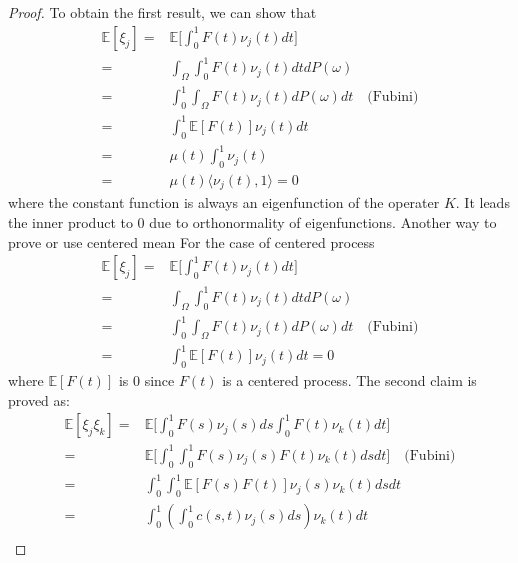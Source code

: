 \documentclass[11pt,twoside,a4paper]{article}
\begin{document}
	\begin{proof}
		To obtain the first result, we can show that
		\begin{equation}
			\begin{split}
				\mathbb{E}[\xi_{j}] = & \mathbb{E} \biggl\lbrack \int_{0}^{1} F(t) \nu_{j}(t)dt \biggr\rbrack\\
				= & \int_{\Omega} \int_{0}^{1} F(t) \nu_{j}(t) dt dP(\omega)\\
				= & \int_{0}^{1} \int_{\Omega} F(t) \nu_{j}(t) dP(\omega) dt \quad \text{(Fubini)}\\
				= & \int_{0}^{1} \mathbb{E}[F(t)] \nu_{j}(t) dt\\
				= & \mu(t) \int_{0}^{1} \nu_{j}(t)\\
				= & \mu(t) \langle \nu_{j}(t), 1 \rangle = 0
			\end{split}
		\end{equation}
		where the constant function is always an eigenfunction of the operater $K$. It leads the inner product to 0 due to orthonormality of eigenfunctions. {\color{red} Another way to prove or use centered mean}
		For the case of centered process
		\begin{equation}\label{Lemma1}
			\begin{split}
				\mathbb{E}[\xi_{j}] = & \mathbb{E} \biggl\lbrack \int_{0}^{1} F(t) \nu_{j}(t)dt\biggr\rbrack\\
				= & \int_{\Omega} \int_{0}^{1} F(t) \nu_{j}(t) dt dP(\omega)\\
				= & \int_{0}^{1} \int_{\Omega} F(t) \nu_{j}(t) dP(\omega) dt \quad \text{(Fubini)}\\
				= & \int_{0}^{1} \mathbb{E}[F(t)] \nu_{j}(t) dt = 0
			\end{split}
		\end{equation}
		where $\mathbb{E}[F(t)]$ is 0 since $F(t)$ is a centered process.
		The second claim is proved as:
		\begin{equation}\label{Lemma2}
			\begin{split}
				\mathbb{E} [\xi_{j} \xi_{k}] = & \mathbb{E}  \biggl\lbrack \int_{0}^{1} F(s) \nu_{j}(s)ds \int_{0}^{1} F(t) \nu_{k}(t)dt  \biggr\rbrack\\
				= & \mathbb{E} \biggl\lbrack {\int_{0}^{1} \int_{0}^{1} F(s) \nu_{j}(s) F(t) \nu_{k}(t) ds dt} \biggr\rbrack \quad \text{(Fubini)}\\
				= & \int_{0}^{1} \int_{0}^{1} \mathbb{E}[{F(s)F(t)}] \nu_{j}(s) \nu_{k}(t) ds dt\\
				= & \int_{0}^{1} \left(\int_{0}^{1}c(s,t)\nu_{j}(s)ds \right) \nu_{k}(t) dt \\

\end{split}
\end{equation}
\end{proof}
\end{document}
